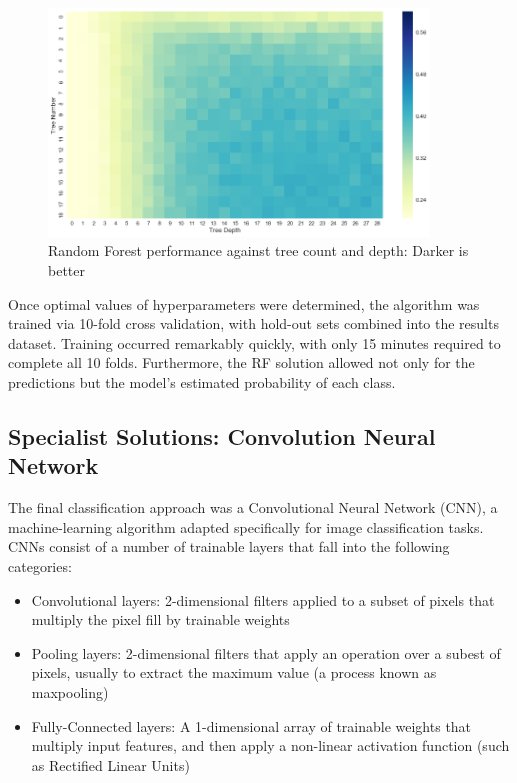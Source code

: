 \documentclass[12pt]{article}
\begin{document}
\begin{figure}[h]
  \caption{Random Forest performance against tree count and depth: Darker is better}
  \label{img:rfhp}
\centering
\includegraphics[width=0.9\textwidth]{images/random_forest_hyperparams.png}
\end{figure}


Once optimal values of hyperparameters were determined, the algorithm was trained via 10-fold cross validation, with hold-out sets combined into the results dataset. Training occurred remarkably quickly, with only 15 minutes required to complete all 10 folds. Furthermore, the RF solution allowed not only for the predictions but the model's estimated probability of each class.

\subsection{Specialist Solutions: Convolution Neural Network}
The final classification approach was a Convolutional Neural Network (CNN), a machine-learning algorithm adapted specifically for image classification tasks. CNNs consist of a number of trainable layers that fall into the following categories:\\
\begin{itemize}
  \item Convolutional layers: 2-dimensional filters applied to a subset of pixels that multiply the pixel fill by trainable weights
  \item Pooling layers: 2-dimensional filters that apply an operation over a subest of pixels, usually to extract the maximum value (a process known as maxpooling)
  \item Fully-Connected layers: A 1-dimensional array of trainable weights that multiply input features, and then apply a non-linear activation function (such as Rectified Linear Units)
\end{itemize}
\end{document}
